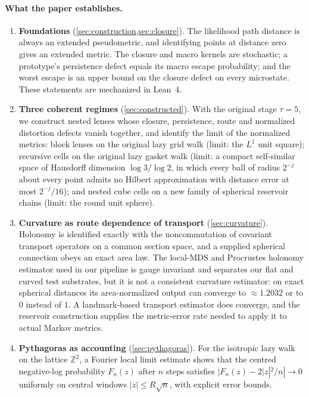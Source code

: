 \documentclass[11pt]{article}
\newcommand{\Z}{\mathbb{Z}}
\begin{document}
\paragraph{What the paper establishes.}
\begin{enumerate}[leftmargin=*]
\item \textbf{Foundations} (\cref{sec:construction,sec:closure}).
The likelihood path distance is always an extended pseudometric, and identifying points at distance zero gives an extended metric.
The closure and macro kernels are stochastic; a prototype's persistence defect equals its macro escape probability; and the worst escape is an upper bound on the closure defect on every microstate.
These statements are mechanized in Lean~4.
\item \textbf{Three coherent regimes} (\cref{sec:constructed}).
With the original stage $\tau=5$, we construct nested lenses whose closure, persistence, route and normalized distortion defects vanish together, and identify the limit of the normalized metrics: block lenses on the original lazy grid walk (limit: the $L^1$ unit square); recursive cells on the original lazy gasket walk (limit: a compact self-similar space of Hausdorff dimension $\log 3/\log 2$, in which every ball of radius $2^{-j}$ about every point admits no Hilbert approximation with distance error at most $2^{-j}/16$); and nested cube cells on a new family of spherical reservoir chains (limit: the round unit sphere).
\item \textbf{Curvature as route dependence of transport} (\cref{sec:curvature}).
Holonomy is identified exactly with the noncommutation of covariant transport operators on a common section space, and a supplied spherical connection obeys an exact area law.
The local-MDS and Procrustes holonomy estimator used in our pipeline is gauge invariant and separates our flat and curved test substrates, but it is not a consistent curvature estimator: on exact spherical distances its area-normalized output can converge to $\approx1.2032$ or to $0$ instead of $1$.
A landmark-based transport estimator does converge, and the reservoir construction supplies the metric-error rate needed to apply it to actual Markov metrics.
\item \textbf{Pythagoras as accounting} (\cref{sec:pythagoras}).
For the isotropic lazy walk on the lattice $\Z^2$, a Fourier local limit estimate shows that the centred negative-log probability $F_n(z)$ after $n$ steps satisfies $|F_n(z)-2|z|^2/n|\to0$ uniformly on central windows $|z|\le R\sqrt n$, with explicit error bounds.

\end{enumerate}
\end{document}
